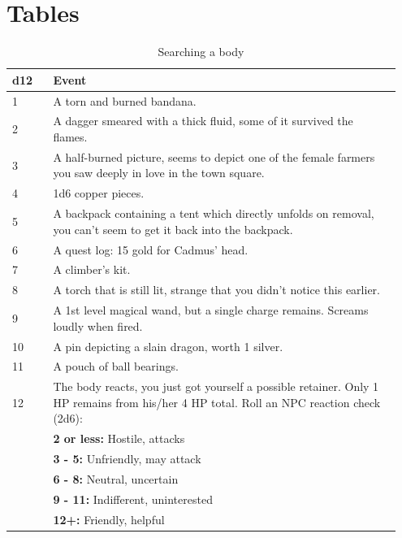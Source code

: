 \documentclass[letterpaper,sansserif,tightsqueeze]{rpg-module}
\begin{document}
\part*{Tables}
\begin{table}[h]
	\caption{Searching a body}
	\label{tab:search_body}
	\begin{tabular}{p{0.1\linewidth} | p{0.85\linewidth}}
		\textbf{d12} 	& \textbf{Event} \\ \hline
		1				& A torn and burned bandana. \\ \hline
		2				& A dagger smeared with a thick fluid, some of it survived the flames. \\ \hline
		3				& A half-burned picture, seems to depict one of the female farmers you saw deeply in love in the town square. \\ \hline
		4				& 1d6 copper pieces. \\ \hline
		5				& A backpack containing a tent which directly unfolds on removal, you can't seem to get it back into the backpack. \\ \hline
		6				& A quest log: 15 gold for Cadmus' head. \\ \hline
		7				& A climber's kit. \\ \hline
		8				& A torch that is still lit, strange that you didn't notice this earlier. \\ \hline
		9				& A 1st level magical wand, but a single charge remains. Screams loudly when fired. \\ \hline
		10				& A pin depicting a slain dragon, worth 1 silver. \\ \hline
		11				& A pouch of ball bearings. \\ \hline
		12				& The body reacts, you just got yourself a possible retainer. Only 1 HP remains from his/her 4 HP total. Roll an NPC reaction check (2d6): \\
		& \textbf{2 or less:} Hostile, attacks \\
		& \textbf{3 - 5:} Unfriendly, may attack \\
		& \textbf{6 - 8:} Neutral, uncertain \\
		& \textbf{9 - 11:} Indifferent, uninterested \\
		& \textbf{12+:} Friendly, helpful
	\end{tabular}
\end{table}
\end{document}
